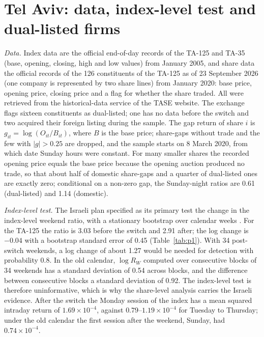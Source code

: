 \appendix
\section{Tel Aviv: data, index-level test and dual-listed firms}\label{app:tase}

\emph{Data.} Index data are the official end-of-day records of the TA-125 and TA-35 (base, opening, closing, high and low values) from January 2005, and share data the official records of the 126 constituents of the TA-125 as of 23 September 2026 (one company is represented by two share lines) from January 2020: base price, opening price, closing price and a flag for whether the share traded. All were retrieved from the historical-data service of the TASE website. The exchange flags sixteen constituents as dual-listed; one has no data before the switch and two acquired their foreign listing during the sample. The gap return of share $i$ is $g_{it}=\log(O_{it}/B_{it})$, where $B$ is the base price; share-gaps without trade and the few with $|g|>0.25$ are dropped, and the sample starts on 8 March 2020, from which date Sunday hours were constant. For many smaller shares the recorded opening price equals the base price because the opening auction produced no trade, so that about half of domestic share-gaps and a quarter of dual-listed ones are exactly zero; conditional on a non-zero gap, the Sunday-night ratios are 0.61 (dual-listed) and 1.14 (domestic).

\emph{Index-level test.} The Israeli plan \citep{PAP1} specified as its primary test the change in the index-level weekend ratio, with a stationary bootstrap over calendar weeks \citep{PolitisRomano1994}. For the TA-125 the ratio is 3.03 before the switch and 2.91 after; the log change is $-0.04$ with a bootstrap standard error of 0.45 (Table~\ref{tab:p1}). With 34 post-switch weekends, a log change of about 1.27 would be needed for detection with probability 0.8. In the old calendar, $\log R_W$ computed over consecutive blocks of 34 weekends has a standard deviation of 0.54 across blocks, and the difference between consecutive blocks a standard deviation of 0.92. The index-level test is therefore uninformative, which is why the share-level analysis carries the Israeli evidence. After the switch the Monday session of the index has a mean squared intraday return of $1.69\times10^{-4}$, against $0.79$--$1.19\times10^{-4}$ for Tuesday to Thursday; under the old calendar the first session after the weekend, Sunday, had $0.74\times10^{-4}$.

